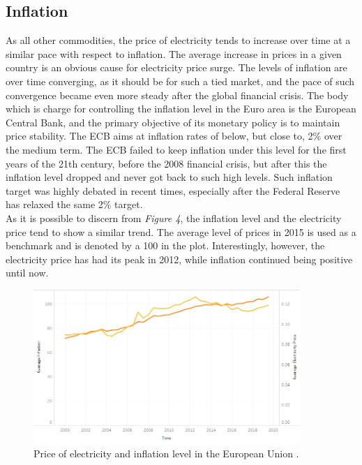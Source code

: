 \documentclass{book}
\begin{document}
\subsection*{Inflation}

As all other commodities, the price of electricity tends to increase over time at a similar pace with respect to inflation. The average increase in prices in a given country is an obvious cause for electricity price surge. The levels of inflation are over time converging, as it should be for such a tied market, and the pace of such convergence became even more steady after the global financial crisis. \cite{brovz2018dynamics} The body which is charge for controlling the inflation level in the Euro area is the European Central Bank, and the primary objective of its monetary policy is to maintain price stability. The ECB aims at inflation rates of below, but close to, 2\% over the medium term. The ECB failed to keep inflation under this level for the first years of the 21th century, before the 2008 financial crisis, but after this the inflation level dropped and never got back to such high levels. Such inflation target was highly debated in recent times, especially after the Federal Reserve has relaxed the same 2\% target.\\

As it is possible to discern from \textit{Figure 4}, the inflation level and the electricity price tend to show a similar trend. The average level of prices in 2015 is used as a benchmark and is denoted by a 100 in the plot. Interestingly, however, the electricity price has had its peak in 2012, while inflation continued being positive until now. 

\bigskip
\begin{figure}[H]
\begin{center}
\captionsetup{justification=centering}
\includegraphics[width=0.9\textwidth]{Images/inf.png}
\caption{Price of electricity and inflation level in the European Union . }
\end{center}
\end{figure}
\bigskip
\end{document}
